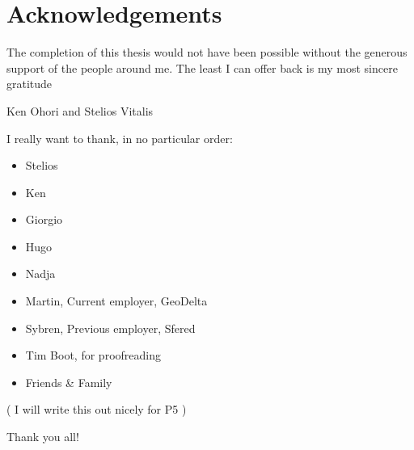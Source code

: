 
\chapter*{Acknowledgements}

The completion of this thesis would not have been possible without the generous support of the people around me. 
The least I can offer back is my most sincere gratitude 


Ken Ohori and Stelios Vitalis

I really want to thank, in no particular order:
\begin{itemize}
    \item Stelios
    \item Ken
    \item Giorgio
    \item Hugo
    \item Nadja
    \item Martin, Current employer, GeoDelta 
    \item Sybren, Previous employer, Sfered
    \item Tim Boot, for proofreading
    \item Friends \& Family
\end{itemize}
( I will write this out nicely for P5 )


Thank you all!